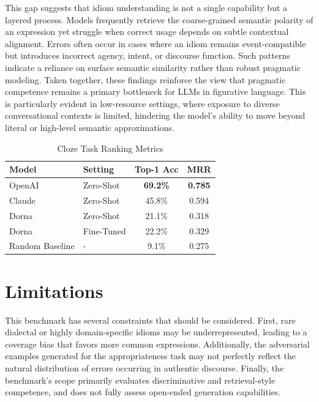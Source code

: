 \documentclass[11pt,a4paper]{article}
\begin{document}
This gap suggests that idiom understanding is not a single capability but a layered process. Models frequently retrieve the coarse-grained semantic polarity of an expression yet struggle when correct usage depends on subtle contextual alignment. Errors often occur in cases where an idiom remains event-compatible but introduces incorrect agency, intent, or discourse function. Such patterns indicate a reliance on surface semantic similarity rather than robust pragmatic modeling. Taken together, these findings reinforce the view that pragmatic competence remains a primary bottleneck for LLMs in figurative language. This is particularly evident in low-resource settings, where exposure to diverse conversational contexts is limited, hindering the model's ability to move beyond literal or high-level semantic approximations.

\begin{table}[htpb]
\centering
\small
\caption{Cloze Task Ranking Metrics}
\label{tab:cloze_results}
\begin{tabular}{llcc}
\toprule
\textbf{Model} & \textbf{Setting} & \textbf{Top-1 Acc} & \textbf{MRR} \\
\midrule
OpenAI & Zero-Shot & \textbf {69.2\%}& \textbf {0.785} \\
Claude & Zero-Shot & 45.8\% & 0.594 \\
Dorna & Zero-Shot & 21.1\% & 0.318 \\
Dorna & Fine-Tuned & 22.2\% & 0.329 \\
\midrule
Random Baseline & - & 9.1\% & 0.275 \\
\bottomrule
\end{tabular}
\end{table}

\section{Limitations}
This benchmark has several constraints that should be considered. First, rare dialectal or highly domain-specific idioms may be underrepresented, leading to a coverage bias that favors more common expressions. Additionally, the adversarial examples generated for the appropriateness task may not perfectly reflect the natural distribution of errors occurring in authentic discourse. Finally, the benchmark’s scope primarily evaluates discriminative and retrieval-style competence, and does not fully assess open-ended generation capabilities.
\end{document}

